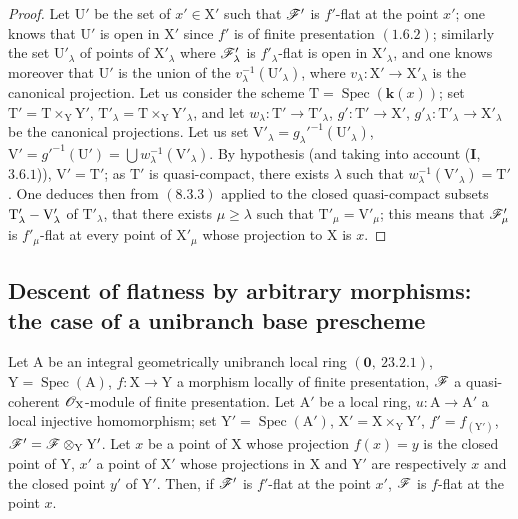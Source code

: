 \begin{proof}
Let $\mathrm{U}'$ be the set of $x'\in\mathrm{X}'$ such that $\mathscr{F}'$ is $f'$-flat at the point $x'$; one knows 
that $\mathrm{U}'$ is open in $\mathrm{X}'$ since $f'$ is of finite presentation $(1.6.2)$; similarly the
set $\mathrm{U}'_\lambda$ of points of $\mathrm{X}'_\lambda$ where $\mathscr{F}'_\lambda$ is $f'_\lambda$-flat is open in $\mathrm{X}'_\lambda$, and one knows moreover
 that $\mathrm{U}'$ is the union of the $v_\lambda^{-1}(\mathrm{U}'_\lambda)$, where $v_\lambda:\mathrm{X}'\to\mathrm{X}'_\lambda$ is the canonical projection.
Let us consider the scheme $\mathrm{T}=\operatorname{Spec}(\boldsymbol{k}(x))$; set $\mathrm{T}'=\mathrm{T}\times_\mathrm{Y}\mathrm{Y}'$, $\mathrm{T}'_\lambda=\mathrm{T}\times_\mathrm{Y}\mathrm{Y}'_\lambda$, and let
$w_\lambda:\mathrm{T}'\to\mathrm{T}'_\lambda$, $g':\mathrm{T}'\to\mathrm{X}'$, $g'_\lambda:\mathrm{T}'_\lambda\to\mathrm{X}'_\lambda$ be the canonical projections. Let us set $\mathrm{V}'_\lambda=g_\lambda'^{-1}(\mathrm{U}'_\lambda)$,
$\mathrm{V}'=g'^{-1}(\mathrm{U}')=\bigcup w_\lambda^{-1}(\mathrm{V}'_\lambda)$. By hypothesis (and taking into account (\textbf{I},~$3.6.1$)), $\mathrm{V}'=\mathrm{T}'$;
as $\mathrm{T}'$ is quasi-compact, there exists $\lambda$ such that $w_\lambda^{-1}(\mathrm{V}'_\lambda)=\mathrm{T}'$. One deduces then from $(8.3.3)$
applied to the closed quasi-compact subsets $\mathrm{T}'_\lambda-\mathrm{V}'_\lambda$ of $\mathrm{T}'_\lambda$, that there exists $\mu\geq\lambda$ such
that $\mathrm{T}'_\mu=\mathrm{V}'_\mu$; this means that $\mathscr{F}'_\mu$ is $f'_\mu$-flat at every point of $\mathrm{X}'_\mu$ whose projection
to $\mathrm{X}$ is $x$.
\end{proof}

\subsection{Descent of flatness by arbitrary morphisms: the case of a unibranch base prescheme}
\label{subsection:IV.11.6}

\begin{theorem}[11.6.1]
\label{IV.11.6.1}
Let $\mathrm{A}$ be an integral geometrically unibranch local ring
$(\mathbf{0},~23.2.1)$, $\mathrm{Y}=\operatorname{Spec}(\mathrm{A})$, $f:\mathrm{X}\to\mathrm{Y}$ a morphism locally of finite presentation, $\mathscr{F}$ a
quasi-coherent $\mathscr{O}_\mathrm{X}$-module of finite presentation. Let $\mathrm{A}'$ be a local ring, $u:\mathrm{A}\to\mathrm{A}'$ a local
injective homomorphism; set $\mathrm{Y}'=\operatorname{Spec}(\mathrm{A}')$, $\mathrm{X}'=\mathrm{X}\times_\mathrm{Y}\mathrm{Y}'$, $f'=f_{(\mathrm{Y}')}$, $\mathscr{F}'=\mathscr{F}\otimes_\mathrm{Y}\mathrm{Y}'$. Let $x$ be
a point of $\mathrm{X}$ whose projection $f(x)=y$ is the closed point of $\mathrm{Y}$, $x'$ a point of $\mathrm{X}'$ whose projections
in $\mathrm{X}$ and $\mathrm{Y}'$ are respectively $x$ and the closed point $y'$ of $\mathrm{Y}'$. Then, if $\mathscr{F}'$ is $f'$-flat at the point $x'$,
$\mathscr{F}$ is $f$-flat at the point $x$.
\end{theorem}

